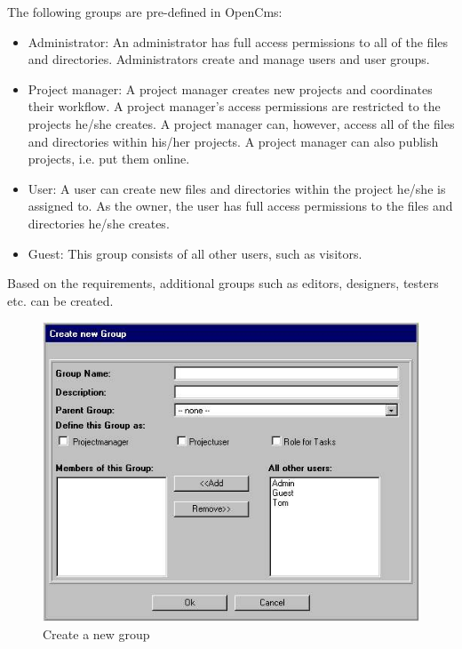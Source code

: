 The following groups are pre-defined in OpenCms:

\begin{itemize}
\item Administrator: An administrator has full access permissions to
all of the files and directories. Administrators create and manage
users and user groups.
\item Project manager: A project manager creates new projects and coordinates their workflow. A project manager's access permissions are restricted to the projects he/she creates. A project manager can, however, access all of the files and directories within his/her projects. A project manager can also publish projects, i.e. put them online.
\item User: A user can create new files and directories within the project he/she is assigned to. As the owner, the user has full access permissions to the files and directories he/she creates.
\item Guest: This group consists of all other users, such as visitors.
\end{itemize}

Based on the requirements, additional groups such as editors,
designers, testers etc. can be created.

\begin{figure}[hbt]
\begin{center}
\includegraphics[width=\sgw]
                   {pics/usermanual/newGroup}
\caption[Create a new group]
           {Create a new group}
\label{newgroup}
\end{center}
\end{figure}

